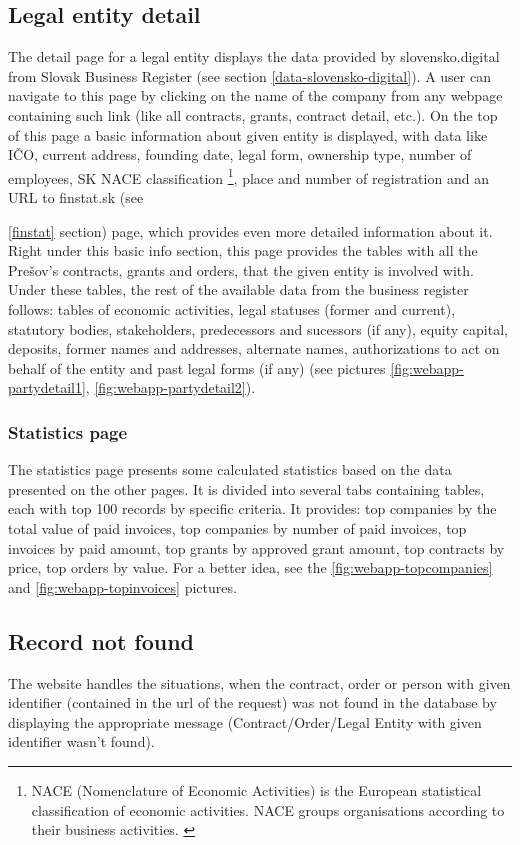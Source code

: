 \documentclass[thesis=B,english]{FITthesis}[2012/06/26]
\begin{document}
\subsection{Legal entity detail}
	The detail page for a legal entity displays the data provided by slovensko.digital from Slovak Business Register (see section \ref{data-slovensko-digital}). A user can navigate to this page by clicking on the name of the company from any webpage containing such link (like all contracts, grants, contract detail, etc.). On the top of this page a basic information about given entity is displayed, with data like IČO, current address, founding date, legal form, ownership type, number of employees, SK NACE classification \footnote{NACE (Nomenclature of Economic Activities) is the European statistical classification of economic activities. NACE groups organisations according to their business activities. \cite{nace}}, place and number of registration and an URL to finstat.sk (see {\ref{finstat} section) page, which provides even more detailed information about it. Right under this basic info section, this page provides the tables with all the Prešov's contracts, grants and orders, that the given entity is involved with. Under these tables, the rest of the available data from the business register follows: tables of economic activities, legal statuses (former and current), statutory bodies, stakeholders,  predecessors and sucessors (if any), equity capital, deposits, former names and addresses, alternate names, authorizations to act on behalf of the entity and past legal forms (if any) (see pictures \ref{fig:webapp-partydetail1}, \ref{fig:webapp-partydetail2}).


\subsubsection{Statistics page}
	The statistics page presents some calculated statistics based on the data presented on the other pages. It is divided into several tabs containing tables, each with top 100 records by specific criteria. It provides: top companies by the total value of paid invoices, top companies by number of paid invoices, top invoices by paid amount, top grants by approved grant amount, top contracts by price, top orders by value. For a better idea, see the \ref{fig:webapp-topcompanies} and \ref{fig:webapp-topinvoices} pictures.

\subsection{Record not found}
	The website handles the situations, when the contract, order or person with given identifier (contained in the url of the request) was not found in the database by displaying the appropriate message (Contract/Order/Legal Entity with given identifier wasn't found).
	
}
\end{document}
